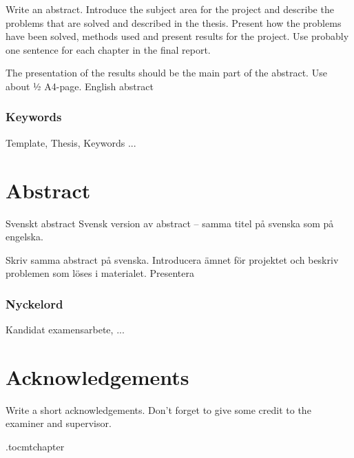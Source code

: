 \vspace{2cm}
Write an abstract. Introduce the subject area for the project and describe the problems that are solved and described in the thesis. Present how the problems have been solved, methods used and present results for the project. Use probably one sentence for each chapter in the final report.

The presentation of the results should be the main part of the abstract. Use about ½ A4-page.
English abstract




\subsection*{Keywords}
Template, Thesis, Keywords ...





\newpage
\thispagestyle{plain}
\chapter*{Abstract}
Svenskt abstract
Svensk version av abstract – samma titel på svenska som på engelska.

Skriv samma abstract på svenska. Introducera ämnet för projektet och beskriv problemen som löses i materialet. Presentera 

\subsection*{Nyckelord}
Kandidat examensarbete, ...


\newpage
\thispagestyle{plain}
\chapter*{Acknowledgements}
Write a short acknowledgements. Don't forget to give some credit to the examiner and supervisor.

\newpage

% 

\newpage

\etocdepthtag.toc{mtchapter}
\thispagestyle{plain}
\tableofcontents

\newpage


